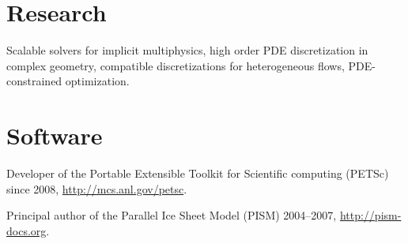 \documentclass[10pt,letterpaper]{article}
\renewenvironment{itemize}{
  \begin{list}{}{
    \setlength{\leftmargin}{1.5em}
    \setlength{\itemsep}{0.25em}
    \setlength{\parskip}{0pt}
    \setlength{\parsep}{0.25em}
  }
}{
  \end{list}
}
\begin{document}
\section*{Research}
\begin{itemize}\item Scalable solvers for implicit multiphysics, high order PDE
  discretization in complex geometry, compatible discretizations for
  heterogeneous flows, PDE-constrained optimization.
\end{itemize}





\section*{Software}
\begin{itemize}
\item Developer of the Portable Extensible Toolkit for Scientific computing (PETSc) since 2008, \url{http://mcs.anl.gov/petsc}.
\item Principal author of the Parallel Ice Sheet Model (PISM) 2004--2007, \url{http://pism-docs.org}.
\end{itemize}
\end{document}
